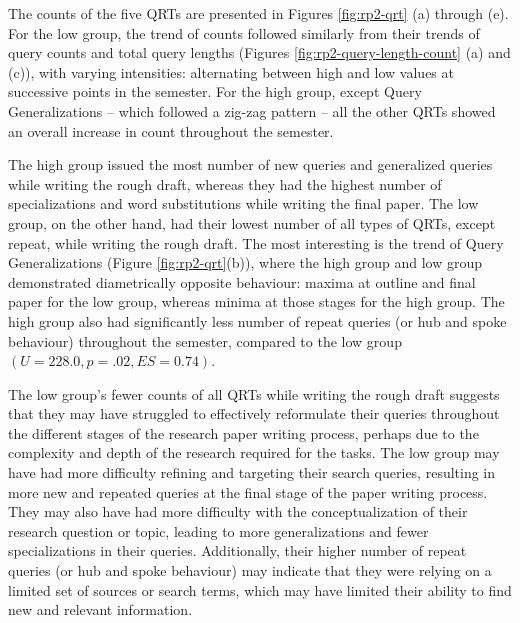 \documentclass[letterpaper, nobind]{templates/ociamthesis}
\begin{document}
The counts of the five QRTs are presented in Figures \ref{fig:rp2-qrt} (a) through (e).
For the low group, the trend of counts followed similarly from their trends of query counts and total query lengths (Figures \ref{fig:rp2-query-length-count} (a) and (c)), with varying intensities: alternating between high and low values at successive points in the semester.
For the high group, except Query Generalizations -- which followed a zig-zag pattern -- all the other QRTs showed an overall increase in count throughout the semester.

The high group issued the most number of new queries and generalized queries while writing the rough draft, whereas they had the highest number of specializations and word substitutions while writing the final paper.
The low group, on the other hand, had their lowest number of all types of QRTs, except repeat, while writing the rough draft.
The most interesting is the trend of Query Generalizations (Figure \ref{fig:rp2-qrt}(b)), where the high group and low group demonstrated diametrically opposite behaviour: maxima at outline and final paper for the low group, whereas minima at those stages for the high group.
The high group also had significantly less number of repeat queries (or hub and spoke behaviour) throughout the semester, compared to the low group \((U = 228.0, p = .02, ES = 0.74)\).

The low group's fewer counts of all QRTs while writing the rough draft suggests that they may have struggled to effectively reformulate their queries throughout the different stages of the research paper writing process, perhaps due to the complexity and depth of the research required for the tasks.
The low group may have had more difficulty refining and targeting their search queries, resulting in more new and repeated queries at the final stage of the paper writing process.
They may also have had more difficulty with the conceptualization of their research question or topic, leading to more generalizations and fewer specializations in their queries.
Additionally, their higher number of repeat queries (or hub and spoke behaviour) may indicate that they were relying on a limited set of sources or search terms, which may have limited their ability to find new and relevant information.
\end{document}
